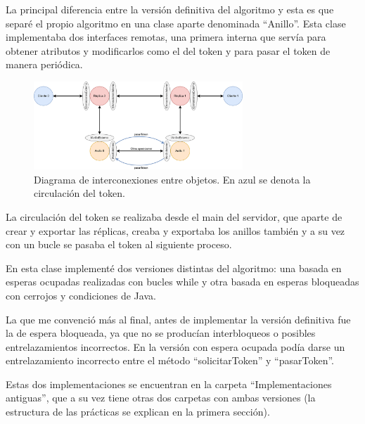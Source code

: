 \documentclass{article}
\begin{document}
La principal diferencia entre la versión definitiva del algoritmo y esta es que separé el propio algoritmo en una clase aparte denominada ``Anillo''. Esta clase implementaba dos interfaces remotas, una primera interna que servía para obtener atributos y modificarlos como el del token y para pasar el token de manera periódica.

\begin{figure}[H]
    \centering
    \includegraphics[width=0.7\textwidth]{imagenes/diagramaAnillosSeparados.png}
    \caption{Diagrama de interconexiones entre objetos. En azul se denota la circulación del token.}
\end{figure}

La circulación del token se realizaba desde el main del servidor, que aparte de crear y exportar las réplicas, creaba y exportaba los anillos también y a su vez con un bucle se pasaba el token al siguiente proceso.

En esta clase implementé dos versiones distintas del algoritmo: una basada en esperas ocupadas realizadas con bucles while y otra basada en esperas bloqueadas con cerrojos y condiciones de Java.

La que me convenció más al final, antes de implementar la versión definitiva fue la de espera bloqueada, ya que no se producían interbloqueos o posibles entrelazamientos incorrectos. En la versión con espera ocupada podía darse un entrelazamiento incorrecto entre el método ``solicitarToken'' y ``pasarToken''.

Estas dos implementaciones se encuentran en la carpeta ``Implementaciones antiguas'', que a su vez tiene otras dos carpetas con ambas versiones (la estructura de las prácticas se explican en la primera sección).
\end{document}
